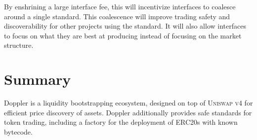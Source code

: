\documentclass[sigconf,nonacm,prologue,table]{acmart}
\numberwithin{equation}{section}
\theoremstyle{definition}
\theoremstyle{remark}
\begin{document}
By enshrining a large interface fee, this will incentivize interfaces to coalesce around a single standard. This coalescence will improve trading safety and discoverability for other projects using the standard. It will also allow interfaces to focus on what they are best at producing instead of focusing on the market structure.

\section{Summary}

Doppler is a liquidity bootstrapping ecosystem, designed on top of \textsc{Uniswap v4} for efficient price discovery of assets. Doppler additionally provides safe standards for token trading, including a factory for the deployment of ERC20s with known bytecode.



\end{document}
